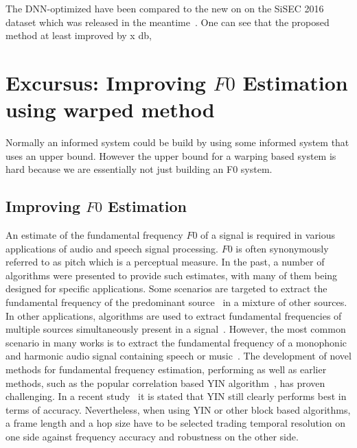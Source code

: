 The DNN-optimized have been compared to the new on on the SiSEC 2016 dataset which was released in the meantime~\cite{stoter..}.
One can see that the proposed method at least improved by x db,

\section{Excursus: Improving $F0$ Estimation using warped method} %
\label{sec:method}


Normally an informed system could be build by using some informed system that uses an upper bound.
However the upper bound for a warping based system is hard because we are essentially not just building an F0 system.

\subsection{Improving $F0$ Estimation}

An estimate of the fundamental frequency $F0$ of a signal is required in various applications of audio and speech signal processing. $F0$ is often synonymously referred to as pitch which is a perceptual measure. In the past, a number of algorithms were presented to provide such estimates, with many of them being designed for specific applications. Some scenarios are targeted to extract the fundamental frequency of the predominant source~\cite{salamon12} in a mixture of other sources. In other applications, algorithms are used to extract fundamental frequencies of multiple sources simultaneously present in a signal~\cite{klapuri2003multiple}. However, the most common scenario in many works is to extract the fundamental frequency of a monophonic and harmonic audio signal containing speech or music~\cite{talkin1995robust, boersma2002praat, de2002yin, resch, camacho2007swipe, tidhar2010high, christensen2007joint}.
%
The development of novel methods for fundamental frequency estimation, performing as well as earlier methods, such as the popular correlation based \textsc{YIN} algorithm~\cite{de2002yin}, has proven challenging. In a recent study~\cite{babacan2013comparative} it is stated that YIN still clearly performs best in terms of accuracy. Nevertheless, when using YIN or other block based algorithms, a frame length and a hop size have to be selected trading temporal resolution on one side against frequency accuracy and robustness on the other side.

